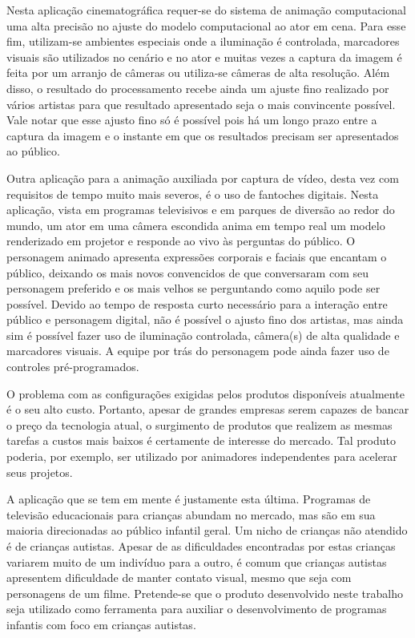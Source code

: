 Nesta aplicação cinematográfica requer-se do sistema de animação computacional uma alta precisão no
ajuste do modelo computacional ao ator em cena. Para esse fim, utilizam-se
ambientes especiais onde a iluminação é controlada, marcadores visuais são
utilizados no cenário e no ator e muitas vezes a captura da imagem é feita por
um arranjo de câmeras ou utiliza-se câmeras de alta resolução. Além disso, o resultado do processamento
recebe ainda um ajuste fino realizado por vários artistas para que resultado
apresentado seja o mais convincente possível. Vale notar que esse ajusto fino só
é possível pois há um longo prazo entre a captura da imagem e o instante em que
os resultados precisam ser apresentados ao público.

Outra aplicação para a animação auxiliada por captura de vídeo, desta vez com
requisitos de tempo muito mais severos, é o uso de fantoches digitais. Nesta
aplicação, vista em programas televisivos e em parques de diversão ao redor do
mundo, um ator em uma câmera escondida anima em tempo real um modelo renderizado
em projetor e responde ao vivo às perguntas do público. O personagem animado
apresenta expressões corporais e faciais que encantam o público, deixando os
mais novos convencidos de que conversaram com seu personagem preferido e os mais
velhos se perguntando como aquilo pode ser possível. Devido ao tempo de resposta
curto necessário para a interação entre público e personagem digital, não é
possível o ajusto fino dos artistas, mas ainda sim é possível fazer uso de
iluminação controlada, câmera(s) de alta qualidade e marcadores visuais. A
equipe por trás do personagem pode ainda fazer uso de controles pré-programados.

O problema com as configurações exigidas pelos produtos disponíveis atualmente é
o seu alto custo. Portanto, apesar de grandes empresas serem capazes de bancar o
preço da tecnologia atual, o surgimento de produtos que realizem as mesmas
tarefas a custos mais baixos é certamente de interesse do mercado. Tal produto
poderia, por exemplo, ser utilizado por animadores independentes para acelerar
seus projetos.

A aplicação que se tem em mente é justamente esta última. Programas de televisão
educacionais para crianças abundam no mercado, mas são em sua maioria
direcionadas ao público infantil geral. Um nicho de crianças não atendido é de
crianças autistas. Apesar de as dificuldades encontradas por estas crianças
variarem muito de um indivíduo para a outro, é comum que crianças autistas
apresentem dificuldade de manter contato visual, mesmo que seja com personagens
de um filme. Pretende-se que o produto desenvolvido neste trabalho seja
utilizado como ferramenta para auxiliar o desenvolvimento de programas infantis
com foco em crianças autistas.

